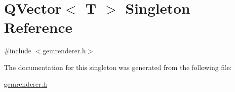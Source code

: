 \hypertarget{singleton_q_vector}{\section{Q\+Vector$<$ T $>$ Singleton Reference}
\label{singleton_q_vector}
}


{\ttfamily \#include $<$gemrenderer.\+h$>$}



The documentation for this singleton was generated from the following file\+:\begin{DoxyCompactItemize}
\item 
\hyperlink{gemrenderer_8h}{gemrenderer.\+h}\end{DoxyCompactItemize}
